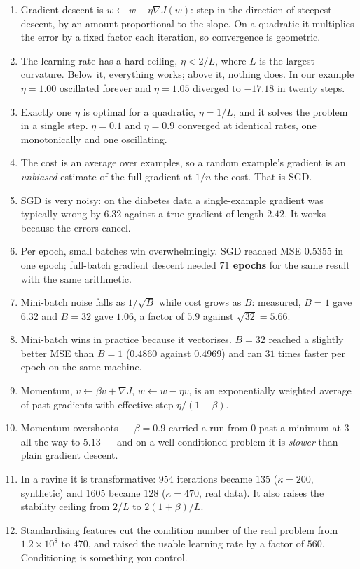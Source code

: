 \documentclass[11pt]{article}
\begin{document}
\begin{enumerate}[leftmargin=*]
  \item Gradient descent is $w \leftarrow w - \eta \nabla J(w)$: step in the
    direction of steepest descent, by an amount proportional to the slope. On a
    quadratic it multiplies the error by a fixed factor each iteration, so
    convergence is geometric.
  \item The learning rate has a hard ceiling, $\eta < 2/L$, where $L$ is the
    largest curvature. Below it, everything works; above it, nothing does. In
    our example $\eta = 1.00$ oscillated forever and $\eta = 1.05$ diverged to
    $-17.18$ in twenty steps.
  \item Exactly one $\eta$ is optimal for a quadratic, $\eta = 1/L$, and it
    solves the problem in a single step. $\eta = 0.1$ and $\eta = 0.9$
    converged at identical rates, one monotonically and one oscillating.
  \item The cost is an average over examples, so a random example's gradient is
    an \emph{unbiased} estimate of the full gradient at $1/n$ the cost. That is
    SGD.
  \item SGD is very noisy: on the diabetes data a single-example gradient was
    typically wrong by $6.32$ against a true gradient of length $2.42$. It
    works because the errors cancel.
  \item Per epoch, small batches win overwhelmingly. SGD reached MSE $0.5355$
    in one epoch; full-batch gradient descent needed \textbf{$71$ epochs} for
    the same result with the same arithmetic.
  \item Mini-batch noise falls as $1/\sqrt{B}$ while cost grows as $B$:
    measured, $B{=}1$ gave $6.32$ and $B{=}32$ gave $1.06$, a factor of $5.9$
    against $\sqrt{32} = 5.66$.
  \item Mini-batch wins in practice because it vectorises. $B=32$ reached a
    slightly better MSE than $B=1$ ($0.4860$ against $0.4969$) and ran $31$
    times faster per epoch on the same machine.
  \item Momentum, $v \leftarrow \beta v + \nabla J$, $w \leftarrow w - \eta v$,
    is an exponentially weighted average of past gradients with effective step
    $\eta/(1-\beta)$.
  \item Momentum overshoots --- $\beta = 0.9$ carried a run from $0$ past a
    minimum at $3$ all the way to $5.13$ --- and on a well-conditioned problem
    it is \emph{slower} than plain gradient descent.
  \item In a ravine it is transformative: $954$ iterations became $135$
    ($\kappa = 200$, synthetic) and $1605$ became $128$ ($\kappa = 470$, real
    data). It also raises the stability ceiling from $2/L$ to $2(1+\beta)/L$.
  \item Standardising features cut the condition number of the real problem
    from $1.2\times 10^8$ to $470$, and raised the usable learning rate by a
    factor of $560$. Conditioning is something you control.
\end{enumerate}
\end{document}
